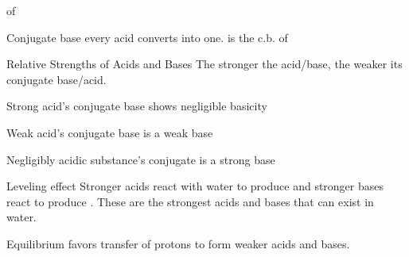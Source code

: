 \begin{mdframed}
\begin{multicols}{2}
\begin{compactdesc}
        of 
    \item[Conjugate base] every acid converts into one.  is the c.b.
        of 
    \item[Relative Strengths of Acids and Bases]
        The stronger the acid/base, the weaker its conjugate base/acid.
        \begin{compactenum}
        \item Strong acid's conjugate base shows negligible basicity
        \item Weak acid's conjugate base is a weak base
        \item Negligibly acidic substance's conjugate is a strong base
        \end{compactenum}
    \item[Leveling effect] Stronger acids react with water to produce
         and stronger bases react to produce . These
        are the strongest acids and bases that can exist in water.
    \item[Equilibrium favors] transfer of protons to form weaker acids and
        bases.
\end{compactdesc}

\end{multicols}
\end{mdframed}



